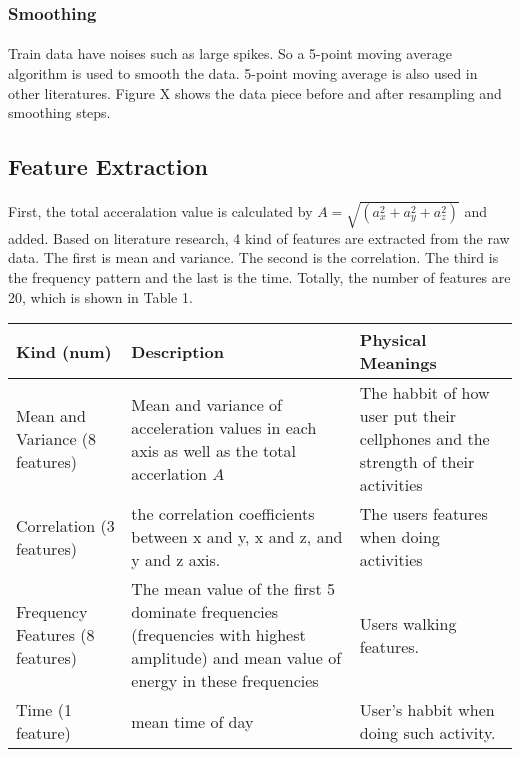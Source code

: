 \documentclass{article}
\begin{document}
		\subsubsection{Smoothing}
		\paragraph{} Train data have noises such as large spikes. So a 5-point moving average algorithm is used to smooth the data. 5-point moving average is also used in other literatures. Figure X shows the data piece before and after resampling and smoothing steps. 
	
		\subsection{Feature Extraction} %
		\label{sub:feature_extraction}
		
		\paragraph{}First, the total acceralation value is calculated by $A=\sqrt{(a_x^2+a_y^2+a_z^2)}$ and added. Based on literature research, 4 kind of features are extracted from the raw data. The first is mean and variance. The second is the correlation. The third is the frequency pattern and the last is the time. Totally, the number of features are 20, which is shown in Table 1. 
		\begin{table}
			\centering
			\begin{tabular}{p{3cm}|p{6cm}|p{4cm}}
			Kind (num)& Description & Physical Meanings \\ \hline
			Mean and Variance (8 features) & Mean and variance of acceleration values in each axis as well as the total accerlation $A$ & The habbit of how user put their cellphones and the strength of their activities \\ \hline
			Correlation (3 features) & the correlation coefficients between x and y, x and z, and y and z axis. & The users features when doing activities \\ \hline
			Frequency Features (8 features) & The mean value of the first 5 dominate frequencies (frequencies with highest amplitude) and mean value of energy in these frequencies & Users walking features.\\ \hline
			Time (1 feature) & mean time of day & User's habbit when doing such activity.
			\end{tabular}
		\end{table}
\end{document}
